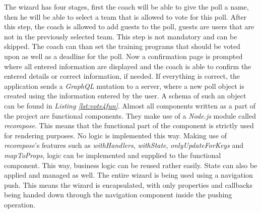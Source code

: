 The wizard has four stages, first the coach will be able to give the poll a name, then he will be able to select a team that is allowed to vote for this poll. After this step, the coach is allowed to add guests to the poll, guests are users that are not in the previously selected team. This step is not mandatory and can be skipped. The coach can than set the training programs that should be voted upon as well as a deadline for the poll.
\newline
Now a confirmation page is prompted where all entered information are displayed and the coach is able to confirm the entered details or correct information, if needed. If everything is correct, the application sends a \textit{GraphQL} mutation to a server, where a new poll object is created using the information entered by the user. A schema of such an object can be found in \textit{Listing \ref{lst:vote4fun}}.
\newline
Almost all components written as a part of the project are functional components. They make use of a \textit{Node.js} module called \textit{recompose}. This means that the functional part of the component is strictly used for rendering purposes. No logic is implemented this way. Making use of \textit{recompose}'s features such as \textit{withHandlers}, \textit{withState}, \textit{onlyUpdateForKeys} and \textit{mapToProps}, logic can be implemented and supplied to the functional component. This way, business logic can be reused rather easily. State can also be applied and managed as well.
\newline
The entire wizard is being used using a navigation push. This means the wizard is encapsulated, with only properties and callbacks being handed down through the navigation component inside the pushing operation.
\newline
